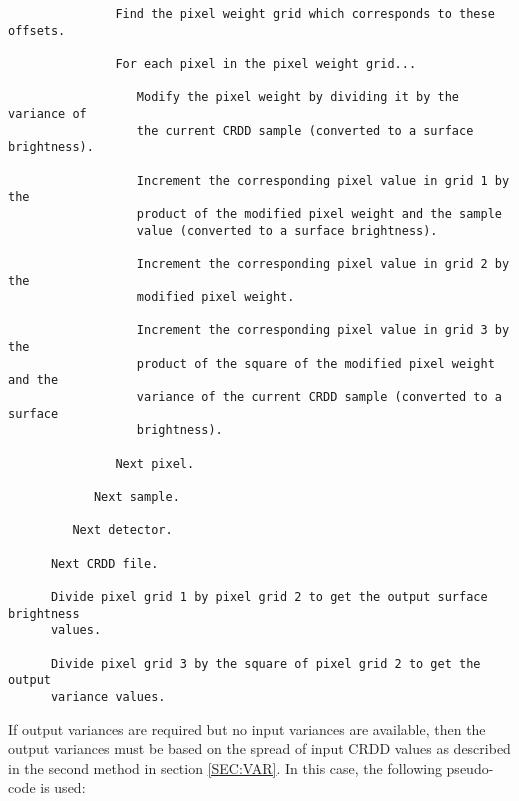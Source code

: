\begin{verbatim}
               Find the pixel weight grid which corresponds to these offsets.

               For each pixel in the pixel weight grid...

                  Modify the pixel weight by dividing it by the variance of
                  the current CRDD sample (converted to a surface brightness).

                  Increment the corresponding pixel value in grid 1 by the 
                  product of the modified pixel weight and the sample
                  value (converted to a surface brightness).

                  Increment the corresponding pixel value in grid 2 by the 
                  modified pixel weight.

                  Increment the corresponding pixel value in grid 3 by the
                  product of the square of the modified pixel weight and the
                  variance of the current CRDD sample (converted to a surface 
                  brightness).

               Next pixel.

            Next sample.

         Next detector.

      Next CRDD file.

      Divide pixel grid 1 by pixel grid 2 to get the output surface brightness
      values.

      Divide pixel grid 3 by the square of pixel grid 2 to get the output 
      variance values.

\end{verbatim}

If output variances are required but no input variances are available, then the 
output variances must be based on the spread of input CRDD values as 
described in the second method in section \ref {SEC:VAR}. In this case, the 
following pseudo-code is used:

